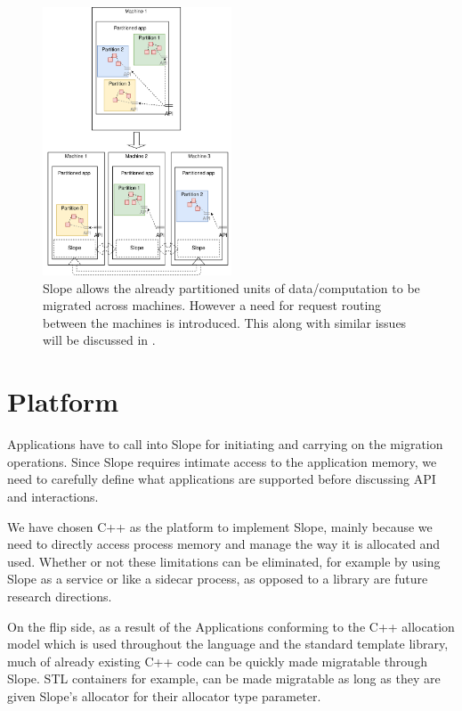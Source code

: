 \begin{figure}[t]
\centering

\includegraphics[width=0.5\textwidth]{design-goals-pluggable.drawio}
\caption{
    Slope allows the already partitioned units of
    data/computation to be migrated across machines. However a need for request
    routing between the machines is introduced. This along with similar issues
    will be discussed in .
}
\label{fig:designgoalspluggable}
\end{figure}

\section{Platform}
\label{sec:platform}

Applications have to call into Slope for initiating and carrying on the
migration operations. Since Slope requires intimate access to the application
memory, we need to carefully define what applications are supported
before discussing API and interactions.

We have chosen C++ as the platform to implement Slope, mainly because we need
to directly access process memory and manage the way it is allocated and used.
Whether or not these limitations can be eliminated, for example by using Slope
as a service or like a sidecar process, as opposed to a library are future
research directions.

On the flip side, as a result of the Applications conforming to the C++
allocation model which is used throughout the language and the standard
template library, much of already existing C++ code can be quickly made
migratable through Slope. STL containers for example, can be made migratable as long as they are given Slope's allocator for their allocator type parameter.

